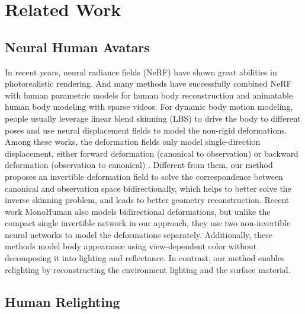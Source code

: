 \section{Related Work}

\subsection{Neural Human Avatars}
In recent years, neural radiance fields (NeRF) \cite{mildenhall2020nerf} have shown great abilities in photorealistic rendering. 
And many methods have successfully combined NeRF with human parametric models for human body reconstruction \cite{neuralbody, humannerf} and animatable human body modeling \cite{ARAH, neuman, slrf, ani-nerf, animatablenerf, peng2022animatable, selfrecon, monohuman} with sparse videos. 
For dynamic body motion modeling, people usually leverage linear blend skinning (LBS) \cite{pose_deformation} to drive the body to different poses and use neural displacement fields to model the non-rigid deformations.
Among these works, the deformation fields only model single-direction displacement, either forward deformation (canonical to observation) \cite{ARAH, tava} or backward deformation (observation to canonical) \cite{animatablenerf, ani-nerf, peng2022animatable}.
Different from them, our method proposes an invertible deformation field to solve the correspondence between canonical and observation space bidirectionally, which helps to better solve the inverse skinning problem, and leads to better geometry reconstruction.
Recent work MonoHuman \cite{monohuman} also models bidirectional deformations, but unlike the compact single invertible network in our approach, they use two non-invertible neural networks to model the deformations separately.
Additionally, these methods model body appearance using view-dependent color without decomposing it into lighting and reflectance.
In contrast, our method enables relighting by reconstructing the environment lighting and the surface material.

\subsection{Human Relighting}

